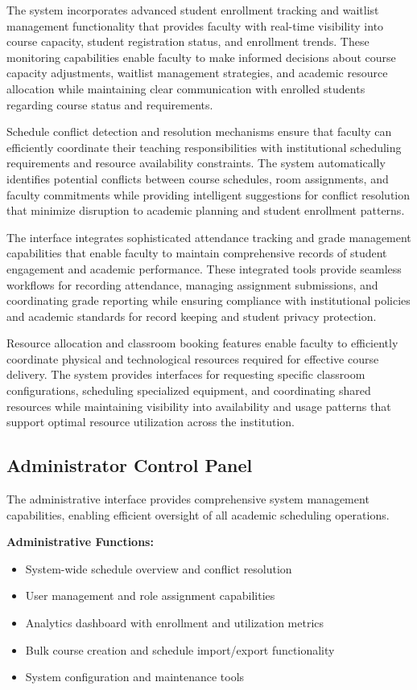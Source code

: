 The system incorporates advanced student enrollment tracking and waitlist management functionality that provides faculty with real-time visibility into course capacity, student registration status, and enrollment trends. These monitoring capabilities enable faculty to make informed decisions about course capacity adjustments, waitlist management strategies, and academic resource allocation while maintaining clear communication with enrolled students regarding course status and requirements.

Schedule conflict detection and resolution mechanisms ensure that faculty can efficiently coordinate their teaching responsibilities with institutional scheduling requirements and resource availability constraints. The system automatically identifies potential conflicts between course schedules, room assignments, and faculty commitments while providing intelligent suggestions for conflict resolution that minimize disruption to academic planning and student enrollment patterns.

The interface integrates sophisticated attendance tracking and grade management capabilities that enable faculty to maintain comprehensive records of student engagement and academic performance. These integrated tools provide seamless workflows for recording attendance, managing assignment submissions, and coordinating grade reporting while ensuring compliance with institutional policies and academic standards for record keeping and student privacy protection.

Resource allocation and classroom booking features enable faculty to efficiently coordinate physical and technological resources required for effective course delivery. The system provides interfaces for requesting specific classroom configurations, scheduling specialized equipment, and coordinating shared resources while maintaining visibility into availability and usage patterns that support optimal resource utilization across the institution.

\subsection{Administrator Control Panel}

The administrative interface provides comprehensive system management capabilities, enabling efficient oversight of all academic scheduling operations.

\textbf{Administrative Functions:}
\begin{itemize}[leftmargin=*]
    \item System-wide schedule overview and conflict resolution
    \item User management and role assignment capabilities
    \item Analytics dashboard with enrollment and utilization metrics
    \item Bulk course creation and schedule import/export functionality
    \item System configuration and maintenance tools
\end{itemize}

